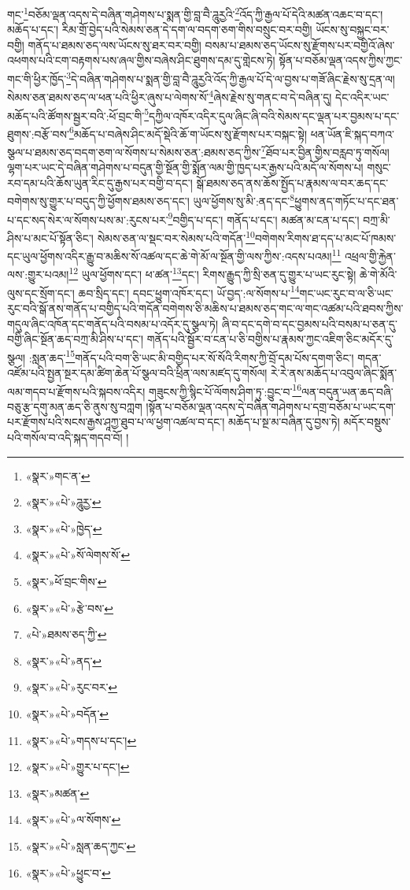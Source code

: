 གང་\footnote{«སྣར་»གང་ན་}བཅོམ་ལྡན་འདས་དེ་བཞིན་གཤེགས་པ་སྨན་གྱི་བླ་བཻ་ཌཱུརྱའི་\footnote{«སྣར་»«པེ་»ཌཱུརྱ་}འོད་ཀྱི་རྒྱལ་པོ་དེའི་མཚན་འཆང་བ་དང་། མཆོད་པ་དང་། རིམ་གྲོ་བྱེད་པའི་སེམས་ཅན་དེ་དག་ལ་བདག་ཅག་གིས་བསྲུང་བར་བགྱི། ཡོངས་སུ་བསྐྱང་བར་བགྱི། གནོད་པ་ཐམས་ཅད་ལས་ཡོངས་སུ་ཐར་བར་བགྱི། བསམ་པ་ཐམས་ཅད་ཡོངས་སུ་རྫོགས་པར་བགྱིའོ་ཞེས་འཕགས་པའི་ངག་བརྟགས་པས་ཞལ་གྱིས་བཞེས་ཤིང་ཐུགས་དམ་དུ་གླེངས་ཏེ། སྟོན་པ་བཅོམ་ལྡན་འདས་ཀྱིས་ཀྱང་གང་གི་ཕྱིར་ཁྱོད་\footnote{«སྣར་»«པེ་»ཁྱེད་}དེ་བཞིན་གཤེགས་པ་སྨན་གྱི་བླ་བཻ་ཌཱུརྱའི་འོད་ཀྱི་རྒྱལ་པོ་དེ་ལ་བྱས་པ་གཟོ་ཞིང་རྗེས་སུ་དྲན་ལ། སེམས་ཅན་ཐམས་ཅད་ལ་ཕན་པའི་ཕྱིར་ཞུས་པ་ལེགས་སོ་\footnote{«སྣར་»«པེ་»སོ་ལེགས་སོ་}ཞེས་རྗེས་སུ་གནང་བ་དེ་བཞིན་དུ། དེང་འདིར་ཡང་མཆོད་པའི་ཚོགས་སྦྱར་བའི་:ཕོ་བྲང་གི་\footnote{«སྣར་»ཕོ་བྲང་གིས་}དཀྱིལ་འཁོར་འདིར་དུལ་ཞིང་ཞི་བའི་སེམས་དང་ལྡན་པར་བྱམས་པ་དང་ཐུགས་:བརྩོ་བས་\footnote{«སྣར་»«པེ་»རྩེ་བས་}མཆོད་པ་བཞེས་ཤིང་མདོ་སྡེའི་ཆོ་ག་ཡོངས་སུ་རྫོགས་པར་བསྐང་སྟེ། ཕན་ཡོན་ཇི་སྐད་བཀའ་སྩལ་པ་ཐམས་ཅད་བདག་ཅག་ལ་སོགས་པ་སེམས་ཅན་:ཐམས་ཅད་ཀྱིས་\footnote{«པེ་»ཐམས་ཅད་ཀྱི་}ཐོབ་པར་བྱིན་གྱིས་བརླབ་ཏུ་གསོལ། ལྷག་པར་ཡང་དེ་བཞིན་གཤེགས་པ་བདུན་གྱི་སྔོན་གྱི་སྨོན་ལམ་གྱི་ཁྱད་པར་རྒྱས་པའི་མདོ་ལ་སོགས་པ། གསུང་རབ་དམ་པའི་ཆོས་ཡུན་རིང་དུ་རྒྱས་པར་བགྱི་བ་དང་། སྒོ་ཐམས་ཅད་ནས་ཆོས་སྤྱོད་པ་རྣམས་ལ་བར་ཆད་དང་བགེགས་སུ་གྱུར་པ་བདུད་ཀྱི་ཕྱོགས་ཐམས་ཅད་དང་། ཡུལ་ཕྱོགས་སུ་མི་:ནད་དང་\footnote{«སྣར་»«པེ་»ནད་}ཕྱུགས་ནད་གཏོང་པ་དང་ཐན་པ་དང་སད་སེར་ལ་སོགས་པས་མ་:རུངས་པར་\footnote{«སྣར་»«པེ་»རུང་བར་}བགྱིད་པ་དང་། གནོད་པ་དང་། མཚན་མ་ངན་པ་དང་། བཀྲ་མི་ཤིས་པ་མང་པོ་སྟོན་ཅིང་། སེམས་ཅན་ལ་སྡང་བར་སེམས་པའི་གདོན་\footnote{«སྣར་»«པེ་»བདོན་}བགེགས་རིགས་ཐ་དད་པ་མང་པོ་ཁམས་དང་ཡུལ་ཕྱོགས་འདིར་རྒྱུ་བ་མཆིས་སོ་འཚལ་དང་ཆེ་གེ་མོ་ལ་སྔོན་གྱི་ལས་ཀྱིས་:འདས་པའམ།\footnote{«སྣར་»«པེ་»གདས་པ་དང་།} འཕྲལ་གྱི་རྐྱེན་ལས་:གྱུར་པའམ།\footnote{«སྣར་»«པེ་»གྱུར་པ་དང་།} ཡུལ་ཕྱོགས་དང་། ཕ་ཚན་\footnote{«སྣར་»མཚན་}དང་། རིགས་རྒྱུད་ཀྱི་སྲི་ཅན་དུ་གྱུར་པ་ཡང་རུང་སྟེ། ཆེ་གེ་མོའི་ལུས་དང་སྲོག་དང་། ཆབ་སྲིད་དང་། དབང་ཕྱུག་འཁོར་དང་། ཡོ་བྱད་:ལ་སོགས་པ་\footnote{«སྣར་»«པེ་»ལ་སོགས་}གང་ཡང་རུང་བ་ལ་ཅི་ཡང་རུང་བའི་སྒོ་ནས་གནོད་པ་བགྱིད་པའི་གདོན་བགེགས་ཅི་མཆིས་པ་ཐམས་ཅད་གང་ལ་གང་འཚམ་པའི་ཐབས་ཀྱིས་གདུལ་ཞིང་འཁོན་དང་གནོད་པའི་བསམ་པ་འདོར་དུ་སྩལ་ཏེ། ཞི་བ་དང་དགེ་བ་དང་བྱམས་པའི་བསམ་པ་ཅན་དུ་བགྱི་ཞིང་སྔོན་ཆད་བཀྲ་མི་ཤིས་པ་དང་། གནོད་པའི་སྦྱོར་བ་ངན་པ་ཅི་བགྱིས་པ་རྣམས་ཀྱང་འཇིག་ཅིང་མདོར་དུ་སྩལ། :སླན་ཆད་\footnote{«སྣར་»«པེ་»སླན་ཆད་ཀྱང་}གནོད་པའི་བག་ཅི་ཡང་མི་བགྱིད་པར་སོ་སོའི་རིགས་ཀྱི་བྲོ་དམ་པོས་དགག་ཅིང་། གདན་འཛོམ་པའི་སྤྱན་སྔར་དམ་ཚིག་ཆེན་པོ་སྩལ་བའི་ཕྲིན་ལས་མཛད་དུ་གསོལ། རེ་རེ་ནས་མཆོད་པ་འབུལ་ཞིང་སྨོན་ལམ་གདབ་པ་རྫོགས་པའི་སྐབས་འདིར། གཟུངས་ཀྱི་སྙིང་པོ་ལོགས་ཤིག་ཏུ་:བྱུང་བ་\footnote{«སྣར་»«པེ་»ཕྱུང་བ་}ལན་བདུན་ཡན་ཆད་བཞི་བཅུ་རྩ་དགུ་མན་ཆད་ཅི་ནུས་སུ་བཀླག །སྟོན་པ་བཅོམ་ལྡན་འདས་དེ་བཞིན་གཤེགས་པ་དགྲ་བཅོམ་པ་ཡང་དག་པར་རྫོགས་པའི་སངས་རྒྱས་ཤཱཀྱ་ཐུབ་པ་ལ་ཕྱག་འཚལ་བ་དང་། མཆོད་པ་སྔ་མ་བཞིན་དུ་བྱས་ཏེ། མདོར་བསྡུས་པའི་གསོལ་བ་འདི་སྐད་གདབ་བོ། །
